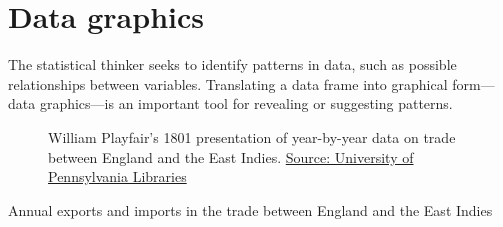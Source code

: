 \documentclass[
  letterpaper,
  DIV=11,
  numbers=noendperiod,
  oneside]{scrartcl}
\begin{document}
\newpage

\section{Data graphics}\label{sec-point_plots}

The statistical thinker seeks to identify patterns in data, such as
possible relationships between variables. Translating a data frame into
graphical form---data graphics---is an important tool for revealing or
suggesting patterns.

\begin{figure}


\caption{\label{fig-playfair}William Playfair's 1801 presentation of
year-by-year data on trade between England and the East Indies.
\href{https://colenda.library.upenn.edu/catalog/81431-p3bv7bb8v}{Source:
University of Pennsylvania Libraries}}

\end{figure}%

\begin{marginfigure}

\caption{\label{tbl-playfair-trade}Annual exports and imports in the
trade between England and the East Indies}


\end{marginfigure}%
\end{document}
